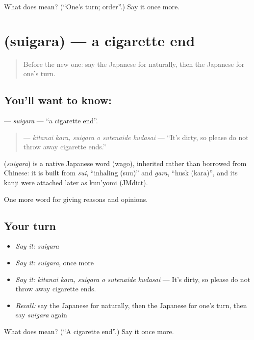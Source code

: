\begin{tcolorbox}[breakable,colback=teal!4,colframe=teal!35!black,title={Before you move on}]
What does  mean? (\textquotedblleft{}One's turn; order\textquotedblright{}.) Say it once more.
\end{tcolorbox}
\section[\texorpdfstring{\ja{すいがら} (suigara)}{すいがら (suigara)}]{ (suigara) — a cigarette end}

\label{lesson:JA-C329-suigara}



\begin{quote}
Before the new one: say the Japanese for naturally, then the Japanese for one's turn.
\end{quote}

\subsection*{You'll want to know: }
\textbf{} — \emph{suigara} — \textquotedblleft{}a cigarette end\textquotedblright{}.

\begin{quote}
\textbf{  } — \emph{kitanai kara, suigara o sutenaide kudasai} — \textquotedblleft{}It's dirty, so please do not throw away cigarette ends.\textquotedblright{}
\end{quote}

\begin{cousinweb}
\textbf{} (\emph{suigara}) is a native Japanese word (wago), inherited rather than borrowed from Chinese: it is built from \emph{sui}, \textquotedblleft{}inhaling (suu)\textquotedblright{} and \emph{gara}, \textquotedblleft{}husk (kara)\textquotedblright{}, and its kanji were attached later as kun'yomi (JMdict).
\end{cousinweb}

\begin{grammarlens}[title={What you've built}]
One more word for giving reasons and opinions.
\end{grammarlens}

\subsection*{Your turn}
\begin{itemize}
\raggedright
  \item \emph{Say it:} \emph{suigara}
  \item \emph{Say it:} \emph{suigara}, once more
  \item \emph{Say it:} \emph{kitanai kara, suigara o sutenaide kudasai} — It's dirty, so please do not throw away cigarette ends.
  \item \emph{Recall:} say the Japanese for naturally, then the Japanese for one's turn, then say \emph{suigara} again
\end{itemize}

\begin{tcolorbox}[breakable,colback=teal!4,colframe=teal!35!black,title={Before you move on}]
What does  mean? (\textquotedblleft{}A cigarette end\textquotedblright{}.) Say it once more.
\end{tcolorbox}
